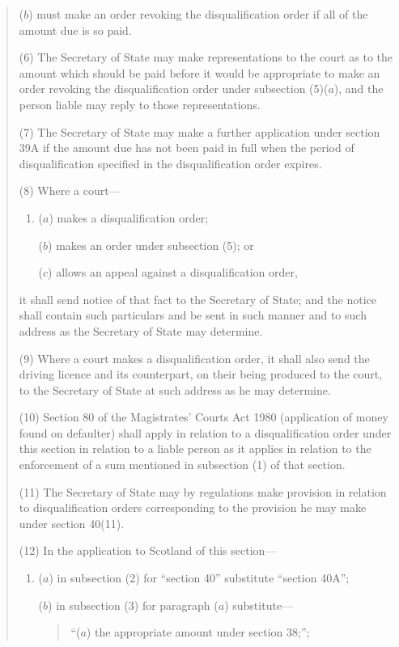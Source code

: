 \documentclass[12pt,a4paper]{article}
\begin{document}
\begin{quotation}
\begin{enumerate}
($b$) must make an order revoking the disqualification order if all of the amount due is so paid.
\end{enumerate}

(6) The Secretary of State may make representations to the court as to the amount which should be paid before it would be appropriate to make an order revoking the disqualification order under subsection (5)($a$), and the person liable may reply to those representations.

(7) The Secretary of State may make a further application under section 39A if the amount due has not been paid in full when the period of disqualification specified in the disqualification order expires.

(8) Where a court—
\begin{enumerate}\item[]
($a$) makes a disqualification order;

($b$) makes an order under subsection (5); or

($c$) allows an appeal against a disqualification order,
\end{enumerate}
it shall send notice of that fact to the Secretary of State; and the notice shall contain such particulars and be sent in such manner and to such address as the Secretary of State may determine.

(9) Where a court makes a disqualification order, it shall also send the driving licence and its counterpart, on their being produced to the court, to the Secretary of State at such address as he may determine.

(10) Section 80 of the Magistrates' Courts Act 1980 (application of money found on defaulter) shall apply in relation to a disqualification order under this section in relation to a liable person as it applies in relation to the enforcement of a sum mentioned in subsection (1)  of that section.

(11) The Secretary of State may by regulations make provision in relation to disqualification orders corresponding to the provision he may make under section 40(11).

(12) In the application to Scotland of this section—
\begin{enumerate}\item[]
($a$) in subsection (2)  for “section 40” substitute “section 40A”;

($b$) in subsection (3)  for paragraph ($a$)  substitute—
\begin{quotation}
“($a$) the appropriate amount under section 38;”;
\end{quotation}


\end{enumerate}
\end{quotation}
\end{document}
